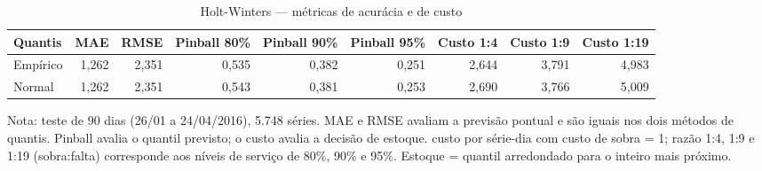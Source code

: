 \begin{table}[htbp]
\centering
\small
\caption{Holt-Winters — métricas de acurácia e de custo}
\label{tab:hw_metricas}
\begin{tabular}{lrrrrrrrr}
\toprule
Quantis & MAE & RMSE & Pinball 80\% & Pinball 90\% & Pinball 95\% & Custo 1:4 & Custo 1:9 & Custo 1:19 \\
\midrule
Empírico & 1,262 & 2,351 & 0,535 & 0,382 & 0,251 & 2,644 & 3,791 & 4,983 \\
Normal & 1,262 & 2,351 & 0,543 & 0,381 & 0,253 & 2,690 & 3,766 & 5,009 \\
\bottomrule
\end{tabular}
\par\smallskip
{\footnotesize Nota: teste de 90 dias (26/01 a 24/04/2016), 5.748 séries. MAE e RMSE avaliam a previsão pontual e são iguais nos dois métodos de quantis. Pinball avalia o quantil previsto; o custo avalia a decisão de estoque. custo por série-dia com custo de sobra = 1; razão 1:4, 1:9 e 1:19 (sobra:falta) corresponde aos níveis de serviço de 80\%, 90\% e 95\%. Estoque = quantil arredondado para o inteiro mais próximo.}
\end{table}
